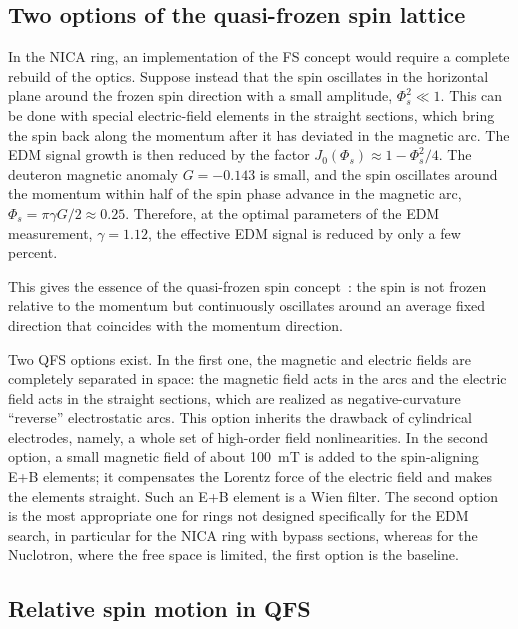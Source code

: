 \subsection{Two options of the quasi-frozen spin lattice}

In the NICA ring, an implementation of the FS concept would require a
complete rebuild of the optics. Suppose instead that the spin oscillates in
the horizontal plane around the frozen spin direction with a small amplitude,
$\Phi_s^2 \ll 1$. This can be done with special electric-field elements in the
straight sections, which bring the spin back along the momentum after it has
deviated in the magnetic arc. The EDM signal growth is then reduced by the
factor $J_0(\Phi_s)\approx 1-\Phi_s^2/4$. The deuteron magnetic anomaly
$G=-0.143$ is small, and the spin oscillates around the momentum within half of
the spin phase advance in the magnetic arc,
$\Phi_s = \pi\gamma G/2 \approx 0.25$. Therefore, at the optimal parameters of
the EDM measurement, $\gamma = 1.12$, the effective EDM signal is reduced by
only a few percent.

This gives the essence of the quasi-frozen spin
concept~\cite{Senichev:2016rez}: the spin is not frozen relative to the
momentum but continuously oscillates around an average fixed direction that
coincides with the momentum direction.

Two QFS options exist. In the first one, the magnetic and electric fields are
completely separated in space: the magnetic field acts in the arcs and the
electric field acts in the straight sections, which are realized as
negative-curvature ``reverse'' electrostatic arcs. This option inherits the
drawback of cylindrical electrodes, namely, a whole set of high-order field
nonlinearities. In the second option, a small magnetic field of about
\SI{100}{mT} is added to the spin-aligning E+B elements; it compensates the
Lorentz force of the electric field and makes the elements straight. Such an
E+B element is a Wien filter. The second option is the most appropriate one
for rings not designed specifically for the EDM search, in particular for the
NICA ring with bypass sections, whereas for the Nuclotron, where the free
space is limited, the first option is the baseline.

\subsection{Relative spin motion in QFS}

